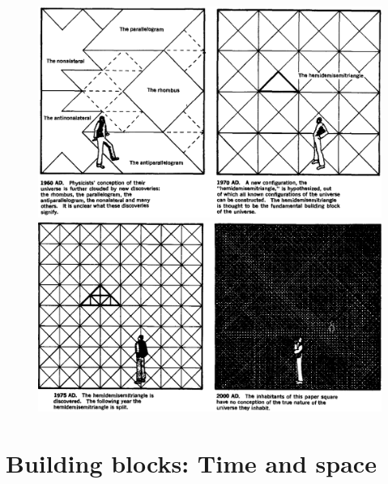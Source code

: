 \documentclass[a4paper,12pt,%
onecolumn,oneside,titlepage,%
british%
]{memoir}
\renewcommand*{\|}[1][]{\nonscript\:#1\vert\nonscript\:\mathopen{}}
\begin{document}
\begin{figure}[p]
  \centering
  \includegraphics[width=1.2\linewidth]{chew3.png}
\\[1em]  \includegraphics[width=1.2\linewidth]{chew4.png}
  \label{fig:chew2}
\end{figure}



\printpagenotes*
\clearpage
\chapter{Building blocks: Time and space}
\label{cha:time_space}
\end{document}
